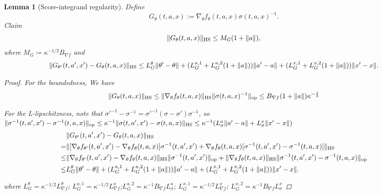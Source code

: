 \documentclass{article}
\newtheorem{lem}[thm]{Lemma}
\theoremstyle{definition}
\theoremstyle{remark}
\newtheorem*{remark}{Remark}
\theoremstyle{mystyle}
\newcommand{\1}{\mathbbm{1}}
\begin{document}
\begin{lem}[Score-integrand regularity]
Define
\[
G_\theta(t,a,x)
:=
\nabla_\theta f_\theta(t,a,x)\sigma(t,a,x)^{-1}.
\]
Claim
\[
\|G_\theta(t,a,x)\|_{\rm HS}\le M_G(1+\|a\|),
\]
where $M_G \coloneqq \kappa^{-1/2}B_{\nabla f}$
and
\[
\|G_{\theta'}(t,a',x')-G_\theta (t,a,x)\|_{\rm HS}\leq L_G^\theta\|\theta'-\theta\|
+
(L_G^{a,1}+L_G^{a,2}(1+\|a\|))\|a'-a\|
+
(L_G^{x,1}+L_G^{x,2}(1+\|a\|))\|x'-x\|.
\]
\begin{proof}
    For the boundedness, We have 
\[
\|G_\theta(t,a,x)\|_{\rm HS}\leq \|\nabla_\theta f_\theta(t,a,x)\|_{\rm HS}\|\sigma(t,a,x)^{-1}\|_{\rm op}\leq B_{\nabla f}(1+\|a\|) \kappa^{-\frac{1}{2}}
\]

For the L-lipschitzness, note that $\sigma'^{-1}-\sigma^{-1}=\sigma'^{-1}(\sigma-\sigma')\sigma^{-1}$, so $\|\sigma^{-1}(t,a',x')-\sigma^{-1}(t,a,x)\|_{\rm op}\leq\kappa^{-1}\|\sigma(t,a',x')-\sigma(t,a,x)\|_{\rm HS}\leq \kappa^{-1}(L^a_\sigma \|a'-a\|+L^x_\sigma\|x'-x\|)$
\begin{align}
    &\|G_{\theta'}(t,a',x')-G_\theta (t,a,x)\|_{\rm HS}\\
    =&\|[\nabla_\theta f_{\theta'}(t,a',x')-\nabla_\theta f_\theta(t,a,x)]\sigma^{-1}(t,a',x')+\nabla_\theta f_\theta(t,a,x)[\sigma^{-1}(t,a',x')-\sigma^{-1}(t,a,x)]\|_{\rm HS}\\
    \leq&\|\nabla_\theta f_{\theta'}(t,a',x')-\nabla_\theta f_\theta(t,a,x)\|_{\rm HS}\|\sigma^{-1}(t,a',x')\|_{\rm op}+\|\nabla_\theta f_\theta(t,a,x)\|_{\rm HS}\|\sigma^{-1}(t,a',x')-\sigma^{-1}(t,a,x)\|_{\rm op} \\
    \leq &L_G^\theta\|\theta'-\theta\|
+
(L_G^{a,1}+L_G^{a,2}(1+\|a\|))\|a'-a\|
+
(L_G^{x,1}+L_G^{x,2}(1+\|a\|))\|x'-x\|.
\end{align}

where $L^\theta_G=\kappa^{-1/2}L^\theta_{\nabla f}$; $L^{a,1}_G=\kappa^{-1/2}L^a_{\nabla f}$;$L^{a,2}_G=\kappa^{-1}B_{\nabla f}L^a_\sigma$; $L^{x,1}_G=\kappa^{-1/2}L^x_{\nabla f}$; $L^{x,2}_G=\kappa^{-1}B_{\nabla f}L^x_\sigma$
\end{proof}
\end{lem}
\end{document}

